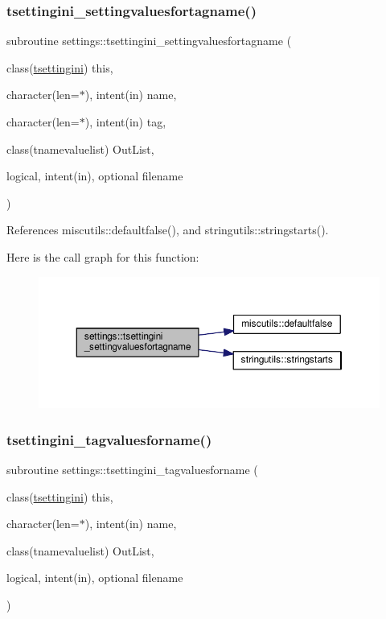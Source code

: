 \subsubsection{\texorpdfstring{tsettingini\+\_\+settingvaluesfortagname()}{tsettingini\_settingvaluesfortagname()}}
{\footnotesize\ttfamily subroutine settings\+::tsettingini\+\_\+settingvaluesfortagname (\begin{DoxyParamCaption}\item[{class(\mbox{\hyperlink{structsettings_1_1tsettingini}{tsettingini}})}]{this,  }\item[{character(len=$\ast$), intent(in)}]{name,  }\item[{character(len=$\ast$), intent(in)}]{tag,  }\item[{class(tnamevaluelist)}]{Out\+List,  }\item[{logical, intent(in), optional}]{filename }\end{DoxyParamCaption})}



References miscutils\+::defaultfalse(), and stringutils\+::stringstarts().

Here is the call graph for this function\+:
\nopagebreak
\begin{figure}[H]
\begin{center}
\leavevmode
\includegraphics[width=350pt]{namespacesettings_a25f07dfd89b1bd5d8754f0c08c0077ef_cgraph}
\end{center}
\end{figure}
\mbox{\label{namespacesettings_ad76733b3c1bf3cec0d9401ce6d924a38}} 
\subsubsection{\texorpdfstring{tsettingini\+\_\+tagvaluesforname()}{tsettingini\_tagvaluesforname()}}
{\footnotesize\ttfamily subroutine settings\+::tsettingini\+\_\+tagvaluesforname (\begin{DoxyParamCaption}\item[{class(\mbox{\hyperlink{structsettings_1_1tsettingini}{tsettingini}})}]{this,  }\item[{character(len=$\ast$), intent(in)}]{name,  }\item[{class(tnamevaluelist)}]{Out\+List,  }\item[{logical, intent(in), optional}]{filename }\end{DoxyParamCaption})}



